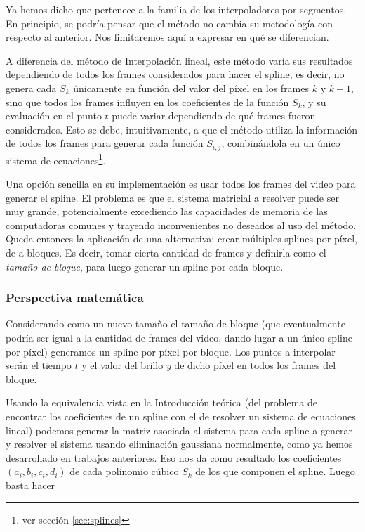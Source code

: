 Ya hemos dicho que pertenece a la familia de los interpoladores por segmentos. En principio, se podr\'ia pensar que el método no cambia su metodolog\'ia con respecto al anterior. Nos limitaremos aquí a expresar en qué se diferencian.

A diferencia del m\'etodo de Interpolaci\'on lineal, este método varía sus resultados dependiendo de todos los frames considerados para hacer el spline, es decir, no genera cada $S_k$ únicamente en función del valor del píxel en los frames $k$ y $k+1$, sino que todos los frames influyen en los coeficientes de la funci\'on $S_k$, y su evaluación en el punto $t$ puede variar dependiendo de qué frames fueron considerados. Esto se debe, intuitivamente, a que el método utiliza la información de todos los frames para generar cada función $S_{i,j}$, combinándola en un único sistema de ecuaciones\footnote{ver sección \ref{sec:splines}}.

Una opción sencilla en su implementación es usar todos los frames del video para generar el spline. El problema es que el sistema matricial a resolver puede ser muy grande, potencialmente excediendo las capacidades de memoria de las computadoras comunes y trayendo inconvenientes no deseados al uso del método. Queda entonces la aplicación de una alternativa: crear múltiples splines por píxel, de a bloques. Es decir, tomar cierta cantidad de frames y definirla como el \textit{tamaño de bloque}, para luego generar un spline por cada bloque.

\subsubsection*{\bf{Perspectiva matem\'atica}}
Considerando como un nuevo tamaño el tamaño de bloque (que eventualmente podría ser igual a la cantidad de frames del video, dando lugar a un único spline por píxel) generamos un spline por píxel por bloque. Los puntos a interpolar serán el tiempo $t$ y el valor del brillo $y$ de dicho píxel en todos los frames del bloque.

Usando la equivalencia vista en la Introducción teórica (del problema de encontrar los coeficientes de un spline con el de resolver un sistema de ecuaciones lineal) podemos generar la matriz asociada al sistema para cada spline a generar y resolver el sistema usando eliminación gaussiana normalmente, como ya hemos desarrollado en trabajos anteriores. Eso nos da como resultado los coeficientes $(a_i,b_i,c_i,d_i)$ de cada polinomio cúbico $S_k$ de los que componen el spline. Luego basta hacer

